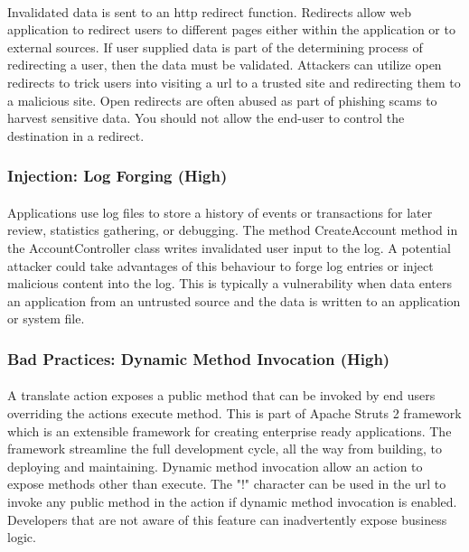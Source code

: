 \documentclass[11pt,english,a4paper]{report}
\begin{document}
\paragraph{}
Invalidated data is sent to an \gls{http} redirect function. 
Redirects allow web application to redirect users to different pages either within the application or to external sources.
If user supplied data is part of the determining process of redirecting a user, then the data must be validated.
Attackers can utilize open redirects to trick users into visiting a \gls{url} to a trusted site and redirecting them to a malicious site.
Open redirects are often abused as part of phishing scams to harvest sensitive data.
You should not allow the end-user to control the destination in a redirect.

\subsubsection{Injection: Log Forging (High)}
\paragraph{}
Applications use log files to store a history of events or transactions for later review, statistics gathering, or debugging.
The method CreateAccount method in the AccountController class writes invalidated user input to the log.
A potential attacker could take advantages of this behaviour to forge log entries or inject malicious content into the log.
This is typically a vulnerability when data enters an application from an untrusted source and the data is written to an application or system file.


\subsubsection{Bad Practices: Dynamic Method Invocation (High)}
\paragraph{}
A translate action exposes a public method that can be invoked by end users overriding the actions execute method.
This is part of Apache Struts 2 framework which is an extensible framework for creating enterprise ready applications.
The framework streamline the full development cycle, all the way from building, to deploying and maintaining. 
Dynamic method invocation allow an action to expose methods other than execute.
The "!" character can be used in the \gls{url} to invoke any public method in the action if dynamic method invocation is enabled.
Developers that are not aware of this feature can inadvertently expose business logic. 
\end{document}
